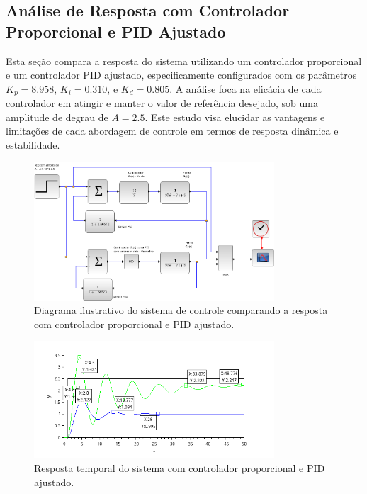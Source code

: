 \subsection{Análise de Resposta com Controlador Proporcional e PID Ajustado}

Esta seção compara a resposta do sistema utilizando um controlador proporcional e um controlador PID ajustado, especificamente configurados com os parâmetros \( K_p = 8.958 \), \( K_i = 0.310 \), e \( K_d = 0.805 \). A análise foca na eficácia de cada controlador em atingir e manter o valor de referência desejado, sob uma amplitude de degrau de \( A = 2.5 \). Este estudo visa elucidar as vantagens e limitações de cada abordagem de controle em termos de resposta dinâmica e estabilidade.

\begin{figure}[H]
    \centering
    \includegraphics[width=0.8\textwidth]{atividades/6-atividade/assets/b/diagrama-comparacao-proporcional-pid.png}
    \caption{Diagrama ilustrativo do sistema de controle comparando a resposta com controlador proporcional e PID ajustado.}
    \label{fig:diagrama-comparacao-proporcional-pid}
\end{figure}

\begin{figure}[H]
    \centering
    \includegraphics[width=0.8\textwidth]{atividades/6-atividade/assets/b/comparacao-proporcional-pid.png}
    \caption{Resposta temporal do sistema com controlador proporcional e PID ajustado.}
    \label{fig:comparacao-proporcional-pid}
\end{figure}


